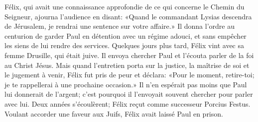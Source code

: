 Félix, qui avait une connaissance approfondie de ce qui concerne le Chemin du Seigneur,
	ajourna l’audience en disant:
	«Quand le commandant Lysias descendra de Jérusalem,
	je rendrai une sentence sur votre affaire.»
Il donna l’ordre au centurion de garder Paul en détention avec un régime adouci,
	et sans empêcher les siens de lui rendre des services.
Quelques jours plus tard, Félix vint avec sa femme Drusille, qui était juive.
Il envoya chercher Paul et l’écouta parler de la foi au Christ Jésus.
Mais quand l’entretien porta sur la justice,
	la maîtrise de soi et le jugement à venir,
	Félix fut pris de peur et déclara:
	«Pour le moment, retire-toi; je te rappellerai à une prochaine occasion.»
Il n’en espérait pas moins que Paul lui donnerait de l’argent;
	c’est pourquoi il l’envoyait souvent chercher pour parler avec lui.
Deux années s’écoulèrent;
	Félix reçut comme successeur Porcius Festus.
Voulant accorder une faveur aux Juifs, Félix avait laissé Paul en prison.
